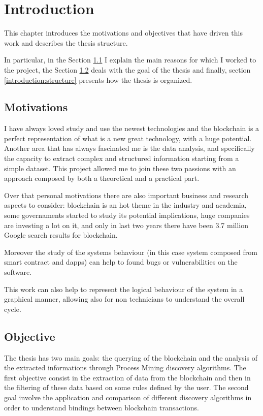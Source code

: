 \chapter{Introduction}

This chapter introduces the motivations and objectives that have driven this work and describes the thesis structure.

In particular, in the Section \ref{introduction:motivations} I explain the main reasons for which I worked to the project, 
the Section \ref{introduction:objective} deals with the goal of the thesis and finally, section \ref{introduction:structure} 
presents how the thesis is organized.


\section{Motivations}
\label{introduction:motivations}
I have always loved study and use the newest technologies and the blockchain is a perfect representation of what is a new 
great technology, with a huge potential. Another area that has always fascinated me is the data analysis, and specifically 
the capacity to extract complex and structured information starting from a simple dataset.
This project allowed me to join these two passions with an approach composed by both a theoretical and a practical part.

Over that personal motivations there are also important business and research aspects to consider: blockchain is an hot theme 
in the industry and academia, some governaments started to study its potential implications, huge companies are investing a 
lot on it, and only in last two years there have been 3.7 million Google search results for blockchain.

Moreover the study of the systems behaviour (in this case system composed from smart contract and dapps) can help to found 
bugs or vulnerabilities on the software. 

This work can also help to represent the logical behaviour of the system in a graphical manner, allowing also for non 
technicians to understand the overall cycle.


\section{Objective}
\label{introduction:objective}
The thesis has two main goals: the querying of the blockchain and the analysis of the extracted informations through Process 
Mining discovery algorithms. The first objective consist in the extraction of data from the blockchain and then in the 
filtering of these data based on some rules defined by the user. The second goal involve the application and comparison of 
different discovery algorithms in order to understand bindings between blockchain transactions. 

